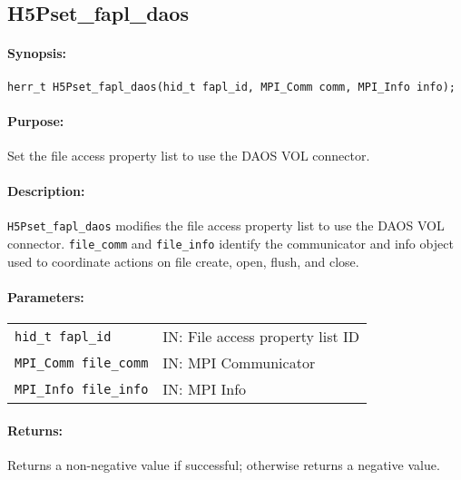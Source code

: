 \documentclass[../users_guide.tex]{subfiles}
\begin{document}
\newpage
\subsection{H5Pset\_fapl\_daos}
\label{ref:h5pset_fapl_daos}

\paragraph{Synopsis:}
\begin{flushleft}%
\begin{verbatim}
herr_t H5Pset_fapl_daos(hid_t fapl_id, MPI_Comm comm, MPI_Info info);
\end{verbatim}
\end{flushleft}%

\paragraph{Purpose:}
\begin{flushleft}%
Set the file access property list to use the DAOS VOL connector.
\end{flushleft}%

\paragraph{Description:}
\begin{flushleft}%
\texttt{H5Pset\_fapl\_daos} modifies the file access property list to use the
DAOS VOL connector. \texttt{file\_comm} and
\texttt{file\_info} identify the communicator and info object used to
coordinate actions on file create, open, flush, and close.
\end{flushleft}%

\paragraph{Parameters:}
\begin{flushleft}%
 \begin{tabular}{ll}%
   \texttt{hid\_t fapl\_id} & IN: File access property list ID \\
   \texttt{MPI\_Comm file\_comm} & IN: MPI Communicator \\
   \texttt{MPI\_Info file\_info} & IN: MPI Info \\
 \end{tabular}%
\end{flushleft}%

\paragraph{Returns:}
\begin{flushleft}%
Returns a non-negative value if successful; otherwise returns a negative value.
\end{flushleft}%
\end{document}
